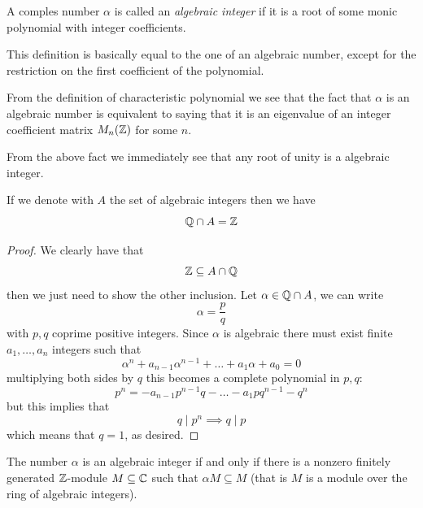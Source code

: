 \documentclass[11pt]{scrartcl}
\begin{document}
	\begin{definition}
		A comples number $\alpha$ is called an \textit{algebraic integer} if it is a root of some monic polynomial with integer coefficients.
	\end{definition}
	This definition is basically equal to the one of an algebraic number, except for the restriction on the first coefficient of the polynomial.
	\begin{remark}
		From the definition of characteristic polynomial we see that the fact that $\alpha$ is an algebraic number is equivalent to saying that it is an eigenvalue of an integer coefficient matrix $M_n(\mathbb Z)$ for some $n$. 
	\end{remark}
	From the above fact we immediately see that any root of unity is a algebraic integer.
	\begin{proposition}
		If we denote with $A$ the set of algebraic integers then we have
		$$\mathbb Q\cap A=\mathbb Z$$
	\end{proposition}
	\begin{proof}
		We clearly have that
		$$\mathbb Z\subseteq A\cap \mathbb Q$$
		then we just need to show the other inclusion. Let $\alpha\in \mathbb Q\cap A$, we can write
		$$\alpha=\frac{p}{q}$$
		with $p,q$ coprime positive integers. Since $\alpha$ is algebraic there must exist finite $a_1,\dots,a_n$ integers such that
		$$\alpha^n+a_{n-1}\alpha^{n-1}+\dots+a_1\alpha+a_0=0$$
		multiplying both sides by $q$ this becomes a complete polynomial in $p,q$:
		$$p^n=-a_{n-1}p^{n-1}q-\dots-a_1pq^{n-1}-q^n$$
		but this implies that
		$$q\mid p^n \implies q\mid p$$
		which means that $q=1$, as desired.
	\end{proof}
	\begin{proposition}
		The number $\alpha$ is an algebraic integer if and only if there is a nonzero finitely generated $\mathbb Z$-module $M\subseteq \mathbb C$ such that $\alpha M\subseteq M$ (that is $M$ is a module over the ring of algebraic integers).
	\end{proposition}
\end{document}
